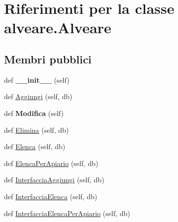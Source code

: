 \hypertarget{classalveare_1_1Alveare}{}\section{Riferimenti per la classe alveare.\+Alveare}
\label{classalveare_1_1Alveare}
\subsection*{Membri pubblici}
\begin{DoxyCompactItemize}
\item 
def {\bfseries \+\_\+\+\_\+init\+\_\+\+\_\+} (self)\hypertarget{classalveare_1_1Alveare_a0e989be377f682b42c586be0b4b7d3dc}{}\label{classalveare_1_1Alveare_a0e989be377f682b42c586be0b4b7d3dc}

\item 
def \hyperlink{classalveare_1_1Alveare_ab96add517787f0990d1a31229b84023e}{Aggiungi} (self, db)
\item 
def {\bfseries Modifica} (self)\hypertarget{classalveare_1_1Alveare_a7ea9f3467476139259dc47d40018c9e2}{}\label{classalveare_1_1Alveare_a7ea9f3467476139259dc47d40018c9e2}

\item 
def \hyperlink{classalveare_1_1Alveare_a9ced552f759d330ebe2001cc90651763}{Elimina} (self, db)
\item 
def \hyperlink{classalveare_1_1Alveare_ae7441be09d9bf0d8c2248a24534b1285}{Elenca} (self, db)
\item 
def \hyperlink{classalveare_1_1Alveare_a94c2d472ef129a78f48584b146c25ad9}{Elenca\+Per\+Apiario} (self, db)
\item 
def \hyperlink{classalveare_1_1Alveare_abf2c97ac838ed0af2326ee4cd4742820}{Interfaccia\+Aggiungi} (self, db)
\item 
def \hyperlink{classalveare_1_1Alveare_aabdd9656e20b585b82c7228ac2333abf}{Interfaccia\+Elenca} (self, db)
\item 
def \hyperlink{classalveare_1_1Alveare_a6ec7088fcbc0c793b13393312214d606}{Interfaccia\+Elenca\+Per\+Apiario} (self, db)
\end{DoxyCompactItemize}
